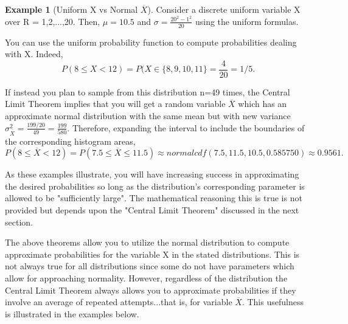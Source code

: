 \documentclass[10pt,]{book}
\theoremstyle{plain}
\theoremstyle{definition}
\theoremstyle{definition}
\newtheorem{example}[theorem]{Example}
\theoremstyle{definition}
\numberwithin{equation}{section}
\newcommand{\lt}{ < }
\begin{document}
\begin{example}[Uniform X vs Normal \(\overline{X}\)]\label{example-26}
Consider a discrete uniform variable X over R = {1,2,...,20}.  Then, \(\mu = 10.5\) and \(\sigma = \frac{20^2-1^2}{20}\) using the uniform formulas.
%
\par
You can use the uniform probability function to compute probabilities dealing with X. Indeed,
\begin{equation*}P(8 \le X \lt 12) = P(X \in \{8,9,10,11 \} = \frac{4}{20} = 1/5.\end{equation*}
%
\par

If instead you plan to sample from this distribution n=49 times, the Central Limit Theorem implies that you will get a random variable \(\overline{X}\) which has an approximate normal distribution with the same mean but with new variance \(\sigma_{\overline{X}}^2 = \frac{199/20}{49} = \frac{199}{580}\).  Therefore, expanding the interval to include the boundaries of the corresponding histogram areas,
\begin{equation*}P( 8 \le \overline{X} \lt 12 ) = P(7.5 \le \overline{X} \le 11.5) \approx normalcdf(7.5,11.5,10.5,0.585750) \approx 0.9561 .\end{equation*}
%
\end{example}
\par

As these examples illustrate, you will have increasing success in approximating the desired probabilities so long as the distribution's corresponding parameter is allowed to be "sufficiently large". The mathematical reasoning this is true is not provided but depends upon the "Central Limit Theorem" discussed in the next section.
%
\par

The above theorems allow you to utilize the normal distribution to compute approximate probabilities for the variable X in the stated distributions. This is not always true for all distributions since some do not have parameters which allow for approaching normality. However, regardless of the distribution the Central Limit Theorem always allows you to approximate probabilities if they involve an average of repeated attempts...that is, for variable \(\overline{X}\). This usefulness is illustrated in the examples below.
%
\typeout{************************************************}
\typeout{************************************************}
\end{document}
